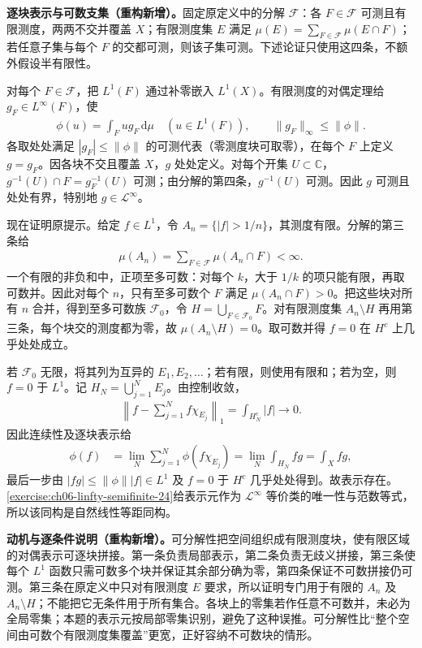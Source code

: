 \documentclass[../../main.tex]{subfiles}
\begin{document}
\begin{solution}
\textbf{逐块表示与可数支集（重构新增）。}固定原定义中的分解 $\mathscr F$：各 $F\in\mathscr F$ 可测且有限测度，两两不交并覆盖 $X$；有限测度集 $E$ 满足 $\mu(E)=\sum_{F\in\mathscr F}\mu(E\cap F)$；若任意子集与每个 $F$ 的交都可测，则该子集可测。下述论证只使用这四条，不额外假设半有限性。

对每个 $F\in\mathscr F$，把 $L^1(F)$ 通过补零嵌入 $L^1(X)$。有限测度的对偶定理给 $g_F\in L^\infty(F)$，使
\begin{align*}
\phi(u)=\int_Fug_F\,\mathrm d\mu\quad(u\in L^1(F)),
\qquad \|g_F\|_\infty\leqslant\|\phi\|.
\end{align*}
各取处处满足 $|g_F|\leqslant\|\phi\|$ 的可测代表（零测度块可取零），在每个 $F$ 上定义 $g=g_F$。因各块不交且覆盖 $X$，$g$ 处处定义。对每个开集 $U\subset\mathbb C$，$g^{-1}(U)\cap F=g_F^{-1}(U)$ 可测；由分解的第四条，$g^{-1}(U)$ 可测。因此 $g$ 可测且处处有界，特别地 $g\in\mathcal L^\infty$。

现在证明原提示。给定 $f\in L^1$，令 $A_n=\{|f|>1/n\}$，其测度有限。分解的第三条给
\begin{align*}
\mu(A_n)=\sum_{F\in\mathscr F}\mu(A_n\cap F)<\infty.
\end{align*}
一个有限的非负和中，正项至多可数：对每个 $k$，大于 $1/k$ 的项只能有限，再取可数并。因此对每个 $n$，只有至多可数个 $F$ 满足 $\mu(A_n\cap F)>0$。把这些块对所有 $n$ 合并，得到至多可数族 $\mathscr F_0$，令 $H=\bigcup_{F\in\mathscr F_0}F$。对有限测度集 $A_n\setminus H$ 再用第三条，每个块交的测度都为零，故 $\mu(A_n\setminus H)=0$。取可数并得 $f=0$ 在 $H^c$ 上几乎处处成立。

若 $\mathscr F_0$ 无限，将其列为互异的 $E_1,E_2,\ldots$；若有限，则使用有限和；若为空，则 $f=0$ 于 $L^1$。记 $H_N=\bigcup_{j=1}^NE_j$。由控制收敛，
\begin{align*}
\left\|f-\sum_{j=1}^Nf\chi_{E_j}\right\|_1
=\int_{H_N^c}|f|\longrightarrow0.
\end{align*}
因此连续性及逐块表示给
\begin{align*}
\phi(f)&=\lim_N\sum_{j=1}^N\phi(f\chi_{E_j})
=\lim_N\int_{H_N}fg
=\int_Xfg,
\end{align*}
最后一步由 $|fg|\leqslant\|\phi\||f|\in L^1$ 及 $f=0$ 于 $H^c$ 几乎处处得到。故表示存在。\cref{exercise:ch06-linfty-semifinite-24}给表示元作为 $\mathcal L^\infty$ 等价类的唯一性与范数等式，所以该同构是自然线性等距同构。
\end{solution}
\begin{remark}
\textbf{动机与逐条件说明（重构新增）。}可分解性把空间组织成有限测度块，使有限区域的对偶表示可逐块拼接。第一条负责局部表示，第二条负责无歧义拼接，第三条使每个 $L^1$ 函数只需可数多个块并保证其余部分确为零，第四条保证不可数拼接仍可测。第三条在原定义中只对有限测度 $E$ 要求，所以证明专门用于有限的 $A_n$ 及 $A_n\setminus H$；不能把它无条件用于所有集合。各块上的零集若作任意不可数并，未必为全局零集；本题的表示元按局部零集识别，避免了这种误推。可分解性比“整个空间由可数个有限测度集覆盖”更宽，正好容纳不可数块的情形。
\end{remark}
\end{document}
